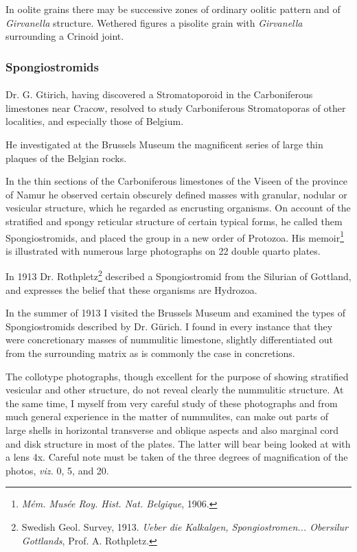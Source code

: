 \documentclass[a4paper, 12pt, oneside, landscape]{article}
\begin{document}
In oolite grains there may be successive zones of ordinary oolitic pattern and of \emph{Girvanella} structure. Wethered figures a pisolite grain with \emph{Girvanella} surrounding a Crinoid joint.

\subsubsection{Spongiostromids}
\paragraph{}
Dr. G. Gtirich, having discovered a Stromatoporoid in the Carboniferous limestones near Cracow, resolved to study Carboniferous Stromatoporas of other localities, and especially those of Belgium.

He investigated at the Brussels Museum the magnificent series of large thin plaques of the Belgian rocks.

In the thin sections of the Carboniferous limestones of the Viseen of the province of Namur he observed certain obscurely defined masses with granular, nodular or vesicular structure, which he regarded as encrusting organisms. On account of the stratified and spongy reticular structure of certain typical forms, he called them Spongiostromids, and placed the group in a new order of Protozoa. His memoir\footnote{\emph{Mém. Musée Roy. Hist. Nat. Belgique}, 1906.} is illustrated with numerous large photographs on 22 double quarto plates.

In 1913 Dr. Rothpletz\footnote{Swedish Geol. Survey, 1913. \emph{Ueber die Kalkalgen, Spongiostromen... Obersilur Gottlands}, Prof. A. Rothpletz.} described a Spongiostromid from the Silurian of Gottland, and expresses the belief that these organisms are Hydrozoa.

In the summer of 1913 I visited the Brussels Museum and examined the types of Spongiostromids described by Dr. Gürich. I found in every instance that they were concretionary masses of nummulitic limestone, slightly differentiated out from the surrounding matrix as is commonly the case in concretions.

The collotype photographs, though excellent for the purpose of showing stratified vesicular and other structure, do not reveal clearly the nummulitic structure. At the same time, I myself from very careful study of these photographs and from much general experience in the matter of nummulites, can make out parts of large shells in horizontal transverse and oblique aspects and also marginal cord and disk structure in most of the plates. The latter will bear being looked at with a lens 4x. Careful note must be taken of the three degrees of magnification of the photos, \emph{viz.} 0, 5, and 20.
\end{document}
